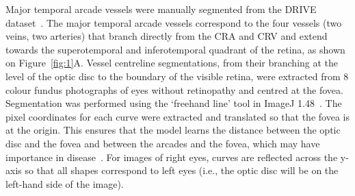 \documentclass[11pt,]{article}
\begin{document}
Major temporal arcade vessels were manually segmented from the DRIVE dataset~\cite{Staal_2004}.
The major temporal arcade vessels correspond to the four
vessels (two veins, two arteries) that branch directly from the
CRA and CRV and extend towards the superotemporal and inferotemporal quadrant of 
the retina, as shown on Figure~\ref{fig:1}A.
Vessel centreline segmentations, from their branching at
the level of the optic disc to the boundary of the visible retina,
were extracted from 8 colour fundus photographs of eyes without retinopathy and centred at the fovea.
Segmentation was performed using the
`freehand line' tool in ImageJ 1.48~\cite{Schneider2012}.  The pixel
coordinates for each curve were extracted and translated so that the
fovea is at the origin.  This ensures that the model learns the
distance between the optic disc and the fovea and between the arcades
and the fovea, which may have importance in disease~\cite{Arslan2021}.
For images of right eyes, curves are reflected across the y-axis so that all shapes correspond to left eyes (i.e., the optic disc will be on the left-hand side of the image).
\end{document}
